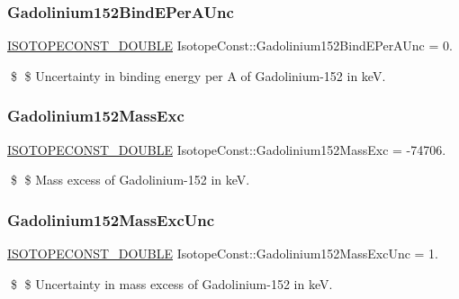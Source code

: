 \subsubsection{\texorpdfstring{Gadolinium152\+Bind\+E\+Per\+A\+Unc}{Gadolinium152BindEPerAUnc}}
{\footnotesize\ttfamily \mbox{\hyperlink{group___isotope_const-_macros_ga8f45a7272ce02c0b4c65c44636ed719a}{I\+S\+O\+T\+O\+P\+E\+C\+O\+N\+S\+T\+\_\+\+D\+O\+U\+B\+LE}} Isotope\+Const\+::\+Gadolinium152\+Bind\+E\+Per\+A\+Unc = 0.}

\$ \$ Uncertainty in binding energy per A of Gadolinium-\/152 in keV. \mbox{\label{group___isotope_const-_gadolinium-_gd152_ga445e36e7b6e5e2cd8f5eb92031948426}} 
\subsubsection{\texorpdfstring{Gadolinium152\+Mass\+Exc}{Gadolinium152MassExc}}
{\footnotesize\ttfamily \mbox{\hyperlink{group___isotope_const-_macros_ga8f45a7272ce02c0b4c65c44636ed719a}{I\+S\+O\+T\+O\+P\+E\+C\+O\+N\+S\+T\+\_\+\+D\+O\+U\+B\+LE}} Isotope\+Const\+::\+Gadolinium152\+Mass\+Exc = -\/74706.}

\$ \$ Mass excess of Gadolinium-\/152 in keV. \mbox{\label{group___isotope_const-_gadolinium-_gd152_ga83eadc5251a670b70bc33082cf13025d}} 
\subsubsection{\texorpdfstring{Gadolinium152\+Mass\+Exc\+Unc}{Gadolinium152MassExcUnc}}
{\footnotesize\ttfamily \mbox{\hyperlink{group___isotope_const-_macros_ga8f45a7272ce02c0b4c65c44636ed719a}{I\+S\+O\+T\+O\+P\+E\+C\+O\+N\+S\+T\+\_\+\+D\+O\+U\+B\+LE}} Isotope\+Const\+::\+Gadolinium152\+Mass\+Exc\+Unc = 1.}

\$ \$ Uncertainty in mass excess of Gadolinium-\/152 in keV. \mbox{\label{group___isotope_const-_gadolinium-_gd152_gae5e37853f2031fd4b4356c2cbf290eab}} 
